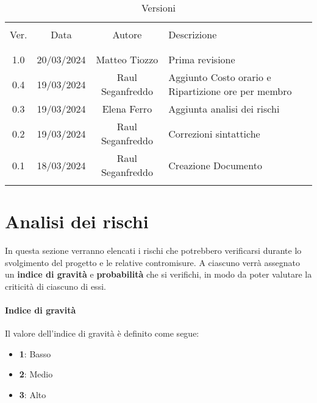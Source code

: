 \documentclass[italian,12pt]{article} %
\begin{document}


\newpage



\begin{table}[!h]
	\caption{Versioni}
	\begin{center}
		\begin{tabular}{ c c c p{9cm} }
			\hline                                                                                     \\[-2ex]
			Ver. & Data       & Autore           & Descrizione                                         \\
			\\[-2ex] \hline \\[-1.5ex]
			1.0  & 20/03/2024 & Matteo Tiozzo    & Prima revisione                                     \\
			0.4  & 19/03/2024 & Raul Seganfreddo & Aggiunto Costo orario e Ripartizione ore per membro \\
			0.3  & 19/03/2024 & Elena Ferro      & Aggiunta analisi dei rischi                         \\
			0.2  & 19/03/2024 & Raul Seganfreddo & Correzioni sintattiche                              \\
			0.1  & 18/03/2024 & Raul Seganfreddo & Creazione Documento                                 \\
			\\[-1.5ex] \hline
		\end{tabular}
	\end{center}
\end{table}

\newpage

\tableofcontents

\newpage

\section{Analisi dei rischi}
In questa sezione verranno elencati i rischi che potrebbero verificarsi durante lo svolgimento del progetto e le relative contromisure.
A ciascuno verrà assegnato un \textbf{indice di gravità} e \textbf{probabilità} che si verifichi, in modo da poter valutare la criticità di ciascuno di essi.

\paragraph{Indice di gravità} Il valore dell'indice di gravità è definito come segue:
\begin{itemize}
	\itemsep0em
	\item \textbf{1}: Basso
	\item \textbf{2}: Medio
	\item \textbf{3}: Alto
\end{itemize}
\end{document}
